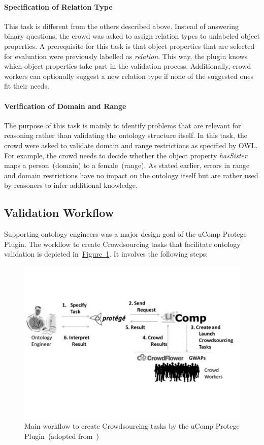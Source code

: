 \paragraph{Specification of Relation Type}
This task is different from the others described above. Instead of answering binary questions, the crowd was asked to assign relation types to unlabeled object properties. A prerequisite for this task is that object properties that are selected for evaluation were previously labelled as \emph{relation}. This way, the plugin knows which object properties take part in the validation process. Additionally, crowd workers can optionally suggest a new relation type if none of the suggested ones fit their needs. 

\paragraph{Verification of Domain and Range}
The purpose of this task is mainly to identify problems that are relevant for reasoning rather than validating the ontology structure itself. In this task, the crowd were asked to validate domain and range restrictions as specified by OWL. For example, the crowd needs to decide whether the object property \emph{hasSister} maps a person~(domain) to a female~(range). As stated earlier, errors in range and domain restrictions have no impact on the ontology itself but are rather used by reasoners to infer additional knowledge. 

\subsection{Validation Workflow}
Supporting ontology engineers was a major design goal of the uComp Protege Plugin.
The workflow to create Crowdsourcing tasks that facilitate ontology validation is depicted in~\hyperref[fig:ucomp_protege_plugin_workflow]{Figure~\ref*{fig:ucomp_protege_plugin_workflow}}.
It involves the following steps:
\begin{figure}
	 \centering
	 \includegraphics[width=\textwidth]{graphics/ucomp_protege_workflow}
	 \caption{Main workflow to create Crowdsourcing tasks by the uComp Protege Plugin~(adopted from~\cite{wohlgenannt2016})}
	 \label{fig:ucomp_protege_plugin_workflow}
\end{figure}

